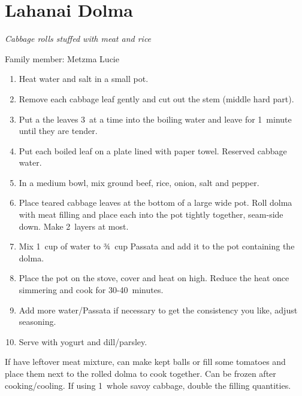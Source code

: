 \chapter{Lahanai Dolma}
\label{ch:lahanai_dolma}



\textit{Cabbage rolls stuffed with meat and rice}

Family member: Metzma Lucie

\begin{enumerate}
    \item Heat water and salt in a small pot.
    \item Remove each cabbage leaf gently and cut out the stem (middle hard part).
    \item Put a the leaves 3~at a time into the boiling water and leave for 1~minute until they are tender.
    \item Put each boiled leaf on a plate lined with paper towel. Reserved cabbage water.
    \item In a medium bowl, mix ground beef, rice, onion, salt and pepper.
    \item Place teared cabbage leaves at the bottom of a large wide pot. Roll dolma with meat filling and place each into the pot tightly together, seam-side down. Make 2~layers at most.
    \item Mix 1~cup of water to ¾~cup Passata and add it to the pot containing the dolma.
    \item Place the pot on the stove, cover and heat on high. Reduce the heat once simmering and cook for 30-40~minutes.
    \item Add more water/Passata if necessary to get the consistency you like, adjust seasoning.
    \item Serve with yogurt and dill/parsley.
\end{enumerate}

If have leftover meat mixture, can make kept balls or fill some tomatoes and place them next to the rolled dolma to cook together.
Can be frozen after cooking/cooling.
If using 1~whole savoy cabbage, double the filling quantities.
